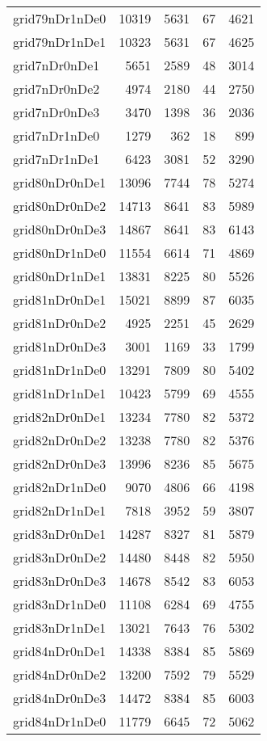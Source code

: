 \documentclass[../../../thesis.tex]{subfiles}
\begin{document}
\begin{longtable}{lrrrr}
grid79nDr1nDe0 & 10319 & 5631 & 67 & 4621 \\
grid79nDr1nDe1 & 10323 & 5631 & 67 & 4625 \\
grid7nDr0nDe1 & 5651 & 2589 & 48 & 3014 \\
grid7nDr0nDe2 & 4974 & 2180 & 44 & 2750 \\
grid7nDr0nDe3 & 3470 & 1398 & 36 & 2036 \\
grid7nDr1nDe0 & 1279 & 362 & 18 & 899 \\
grid7nDr1nDe1 & 6423 & 3081 & 52 & 3290 \\
grid80nDr0nDe1 & 13096 & 7744 & 78 & 5274 \\
grid80nDr0nDe2 & 14713 & 8641 & 83 & 5989 \\
grid80nDr0nDe3 & 14867 & 8641 & 83 & 6143 \\
grid80nDr1nDe0 & 11554 & 6614 & 71 & 4869 \\
grid80nDr1nDe1 & 13831 & 8225 & 80 & 5526 \\
grid81nDr0nDe1 & 15021 & 8899 & 87 & 6035 \\
grid81nDr0nDe2 & 4925 & 2251 & 45 & 2629 \\
grid81nDr0nDe3 & 3001 & 1169 & 33 & 1799 \\
grid81nDr1nDe0 & 13291 & 7809 & 80 & 5402 \\
grid81nDr1nDe1 & 10423 & 5799 & 69 & 4555 \\
grid82nDr0nDe1 & 13234 & 7780 & 82 & 5372 \\
grid82nDr0nDe2 & 13238 & 7780 & 82 & 5376 \\
grid82nDr0nDe3 & 13996 & 8236 & 85 & 5675 \\
grid82nDr1nDe0 & 9070 & 4806 & 66 & 4198 \\
grid82nDr1nDe1 & 7818 & 3952 & 59 & 3807 \\
grid83nDr0nDe1 & 14287 & 8327 & 81 & 5879 \\
grid83nDr0nDe2 & 14480 & 8448 & 82 & 5950 \\
grid83nDr0nDe3 & 14678 & 8542 & 83 & 6053 \\
grid83nDr1nDe0 & 11108 & 6284 & 69 & 4755 \\
grid83nDr1nDe1 & 13021 & 7643 & 76 & 5302 \\
grid84nDr0nDe1 & 14338 & 8384 & 85 & 5869 \\
grid84nDr0nDe2 & 13200 & 7592 & 79 & 5529 \\
grid84nDr0nDe3 & 14472 & 8384 & 85 & 6003 \\
grid84nDr1nDe0 & 11779 & 6645 & 72 & 5062 \\

\end{longtable}
\end{document}
